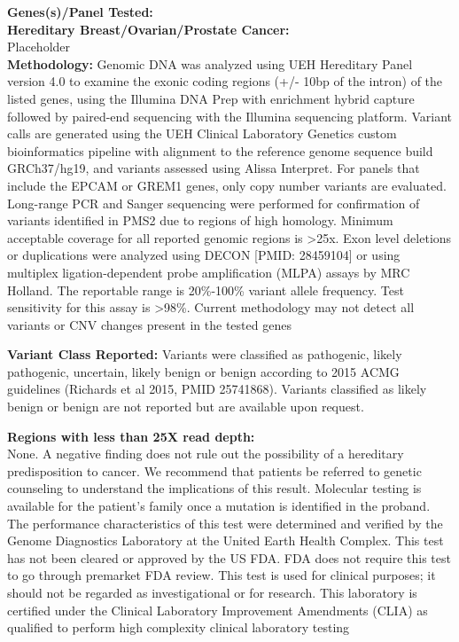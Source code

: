 \documentclass[11pt]{extarticle}
\begin{document}
\begin{flushleft}
{\bf
Genes(s)/Panel Tested:\\
Hereditary Breast/Ovarian/Prostate Cancer: \\}
Placeholder \\
{\bf Methodology: } Genomic DNA was analyzed using UEH Hereditary Panel version 4.0 to examine the exonic coding regions (+/- 10bp of the intron) of the listed genes, using the Illumina DNA Prep with enrichment hybrid capture followed by paired-end sequencing with the Illumina sequencing platform. Variant calls are generated using the UEH Clinical Laboratory Genetics custom bioinformatics pipeline with alignment to the reference genome sequence build GRCh37/hg19, and variants assessed using Alissa Interpret. For panels that include the EPCAM or GREM1 genes, only copy number variants are evaluated. Long-range PCR and Sanger sequencing were performed for confirmation of variants identified in PMS2 due to regions of high homology. Minimum acceptable coverage for all reported genomic regions is >25x. Exon level deletions or duplications were analyzed using DECON [PMID: 28459104] or using multiplex ligation-dependent probe amplification (MLPA) assays by MRC Holland. The reportable range is 20\%-100\% variant allele frequency. Test sensitivity for this assay is >98\%. Current methodology may not detect all variants or CNV changes present in the tested genes

{\bf Variant Class Reported: } Variants were classified as pathogenic, likely pathogenic, uncertain, likely benign or benign according to 2015 ACMG guidelines (Richards et al 2015, PMID 25741868). Variants classified as likely benign or benign are not reported but are available upon request. 

{\bf Regions with less than 25X read depth: \\}
None. 
\newline
\newline
A negative finding does not rule out the possibility of a hereditary predisposition to cancer. We recommend that patients be referred to genetic counseling to understand the implications of this result. Molecular testing is available for the patient's family once a mutation is identified in the proband. 
\newline
\newline
The performance characteristics of this test were determined and verified by the Genome Diagnostics Laboratory at the United Earth Health Complex. This test has not been cleared or approved by the US FDA. FDA does not require this test to go through premarket FDA review. This test is used for clinical purposes; it should not be regarded as investigational or for research. This laboratory is certified under the Clinical Laboratory Improvement Amendments (CLIA) as qualified to perform high complexity clinical laboratory testing
\end{flushleft}
\end{document}

